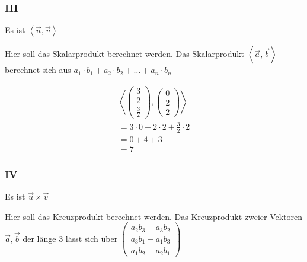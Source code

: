 \subsubsection{III}
Es ist $\left\langle\vec{u}, \vec{v}\right\rangle$

Hier soll das Skalarprodukt berechnet werden. Das Skalarprodukt
$\left\langle\vec{a}, \vec{b}\right\rangle$ berechnet sich aus $a_1 \cdot b_1 +
    a_2 \cdot b_2 + \dots + a_n \cdot b_n$

\begin{align*}
    \left\langle \begin{pmatrix}
                     3 \\ 2 \\ \frac{3}{2}
                 \end{pmatrix}, \begin{pmatrix}
                                    0 \\ 2 \\ 2
                                \end{pmatrix}\right\rangle \\
    = 3 \cdot 0 + 2 \cdot 2 + \frac{3}{2} \cdot 2          \\
    = 0 + 4 + 3                                            \\
    = 7
\end{align*}

\subsubsection{IV}
Es ist $\vec{u} \times \vec{v}$

Hier soll das Kreuzprodukt berechnet werden. Das Kreuzprodukt zweier Vektoren
$\vec{a}, \vec{b}$ der länge 3 lässt sich über $\begin{pmatrix}a_2b_3 - a_3b_2 \\ a_3b_1 - a_1b_3 \\ a_1b_2 - a_2b_1 \end{pmatrix}$

